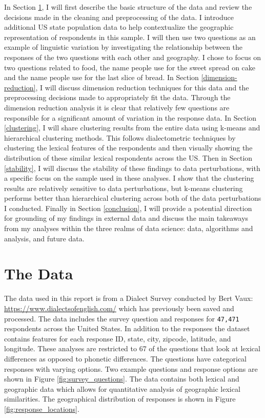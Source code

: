 \documentclass[10pt,letterpaper]{article}
\begin{document}
In Section \ref{data}, I will first describe the basic structure of the data and review the decisions made in the cleaning and preprocessing of the data. I introduce additional US state population data to help contextualize the geographic representation of respondents in this sample. I will then use two questions as an example of linguistic variation by investigating the relationship between the responses of the two questions with each other and geography. I chose to focus on two questions related to food, the name people use for the sweet spread on cake and the name people use for the last slice of bread. In Section \ref{dimension-reduction}, I will discuss dimension reduction techniques for this data and the preprocessing decisions made to appropriately fit the data. Through the dimension reduction analysis it is clear that relatively few questions are responsible for a significant amount of variation in the response data. In Section \ref{clustering}, I will share clustering results from the entire data using k-means and hierarchical clustering methods. This follows dialectometric techniques by clustering the lexical features of the respondents and then visually showing the distribution of these similar lexical respondents across the US. Then in Section \ref{stability}, I will discuss the stability of these findings to data perturbations, with a specific focus on the sample used in these analyses. I show that the clustering results are relatively sensitive to data perturbations, but k-means clustering performs better than hierarchical clustering across both of the data perturbations I conducted. Finally in Section \ref{conclusion}, I will provide a potential direction for grounding of my findings in external data and discuss the main takeaways from my analyses within the three realms of data science: data, algorithms and analysis, and future data.


\section{The Data}\label{data}

The data used in this report is from a Dialect Survey conducted by Bert Vaux: \url{https://www.dialectsofenglish.com/} which has previously been saved and processed. The data includes the survey question and responses for \texttt{47,471} respondents across the United States. In addition to the responses the dataset contains features for each response ID, state, city, zipcode, latitude, and longitude. These analyses are restricted to 67 of the questions that look at lexical differences as opposed to phonetic differences. The questions have categorical responses with varying options. Two example questions and response options are shown in Figure \ref{fig:survey_questions}. The data contains both lexical and geographic data which allows for quantitative analysis of geographic lexical similarities. The geographical distribution of responses is shown in Figure \ref{fig:response_locations}.
\end{document}
